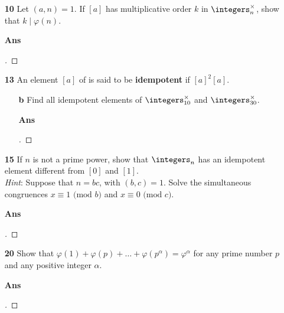 \documentclass[paper=usletter, fontsize=12pt]{article}
\begin{document}
\begin{itemize}
\begin{itemize}
\begin{itemize}
            \end{itemize}

            \item[\textbf{10}] Let $(a, n)=1$. If $[a]$ has multiplicative
            order $k$ in $\integers_n^\times$, show that $k \mid \varphi(n)$.
            \item[\textbf{Ans}]
            \begin{proof}[\unskip\nopunct]
            \end{proof}
            \vspace{0.2in}

            \item[\textbf{13}] An element $[a]$ of is said to be
            \textbf{idempotent} if $[a]^2 [a]$.
            \begin{itemize}

                \item[\textbf{b}] Find all idempotent elements of
                $\integers_{10}^\times$ and $\integers_{30}^\times$.
                \item[\textbf{Ans}]
                \begin{proof}[\unskip\nopunct]
                \end{proof}
                \vspace{0.2in}

            \end{itemize}

            \item[\textbf{15}] If $n$ is not a prime power, show that
            $\integers_n$ has an idempotent element different from $[0]$ and
            $[1]$.\\ \textit{Hint}: Suppose that $n=bc$, with $(b, c)=1$. Solve
            the simultaneous congruences $x \equiv 1 \text{ (mod  $b$)}$ and $x
            \equiv 0 \text{ (mod  $c$)}$.
            \item[\textbf{Ans}]
            \begin{proof}[\unskip\nopunct]
            \end{proof}
            \vspace{0.2in}

            \item[\textbf{20}] Show that
            $\varphi(1)+\varphi(p)+\ldots+\varphi(p^\alpha)=\varphi^\alpha$ for
            any prime number $p$ and any positive integer $\alpha$.
            \item[\textbf{Ans}]
            \begin{proof}[\unskip\nopunct]
            \end{proof}
            \vspace{0.2in}


\end{itemize}
\end{itemize}
\end{document}
